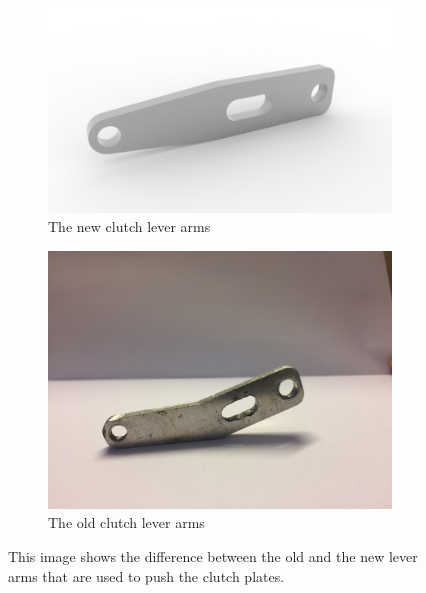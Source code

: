 \begin{figure}[H]
    \centering
    \begin{subfigure}[H]{0.55\textwidth}
    \label{fig:clutch}
    \includegraphics[width=\textwidth]{./img/clutch}
    \caption{The new clutch lever arms}
    \end{subfigure}
    \begin{subfigure}[H]{0.44\textwidth}
    \label{fig:old_clutch}
    \includegraphics[width=\textwidth]{./img/Clutch_old}
    \caption{The old clutch lever arms}
    \end{subfigure}
    \caption{This image shows the difference between the old and the new lever arms that are used to push the clutch plates.}
\end{figure}

